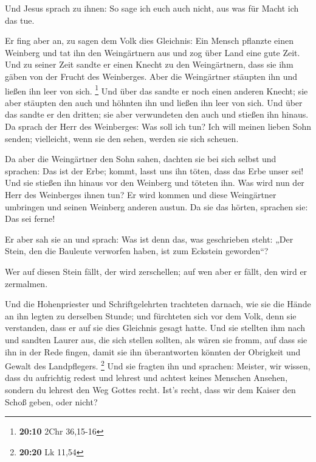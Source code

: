  Und Jesus sprach zu ihnen: So sage ich euch auch nicht, aus
was für Macht ich das tue.

 Er fing aber an, zu sagen dem Volk dies Gleichnis: Ein
Mensch pflanzte einen Weinberg und tat ihn den Weingärtnern aus und zog
über Land eine gute Zeit.  Und zu seiner Zeit sandte er
einen Knecht zu den Weingärtnern, dass sie ihm gäben von der Frucht des
Weinberges. Aber die Weingärtner stäupten ihn und ließen ihn leer von
sich. \footnote{\textbf{20:10} 2Chr 36,15-16}  Und über das
sandte er noch einen anderen Knecht; sie aber stäupten den auch und
höhnten ihn und ließen ihn leer von sich.  Und über das
sandte er den dritten; sie aber verwundeten den auch und stießen ihn
hinaus.  Da sprach der Herr des Weinberges: Was soll ich
tun? Ich will meinen lieben Sohn senden; vielleicht, wenn sie den sehen,
werden sie sich scheuen.

 Da aber die Weingärtner den Sohn sahen, dachten sie bei
sich selbst und sprachen: Das ist der Erbe; kommt, lasst uns ihn töten,
dass das Erbe unser sei!  Und sie stießen ihn hinaus vor
den Weinberg und töteten ihn. Was wird nun der Herr des Weinberges ihnen
tun?  Er wird kommen und diese Weingärtner umbringen und
seinen Weinberg anderen austun. Da sie das hörten, sprachen sie: Das sei
ferne!

 Er aber sah sie an und sprach: Was ist denn das, was
geschrieben steht: „Der Stein, den die Bauleute verworfen haben, ist zum
Eckstein geworden``?

 Wer auf diesen Stein fällt, der wird zerschellen; auf wen
aber er fällt, den wird er zermalmen.

 Und die Hohenpriester und Schriftgelehrten trachteten
darnach, wie sie die Hände an ihn legten zu derselben Stunde; und
fürchteten sich vor dem Volk, denn sie verstanden, dass er auf sie dies
Gleichnis gesagt hatte.  Und sie stellten ihm nach und
sandten Laurer aus, die sich stellen sollten, als wären sie fromm, auf
dass sie ihn in der Rede fingen, damit sie ihn überantworten könnten der
Obrigkeit und Gewalt des Landpflegers. \footnote{\textbf{20:20} Lk 11,54}
 Und sie fragten ihn und sprachen: Meister, wir wissen,
dass du aufrichtig redest und lehrest und achtest keines Menschen
Ansehen, sondern du lehrest den Weg Gottes recht.  Ist's
recht, dass wir dem Kaiser den Schoß geben, oder nicht?

